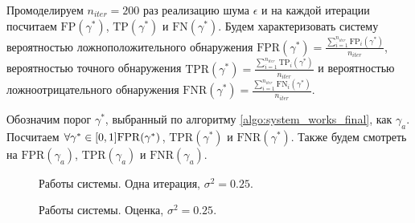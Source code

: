 \documentclass[specialist, substylefile = spbu.rtx,
			   subf, href, 12pt]{disser}
\begin{document}
Промоделируем $ n_{iter}=200 $ раз реализацию шума $ \epsilon $ и на каждой итерации посчитаем $ \mathrm{FP}(\gamma^*) $, $ \mathrm{TP}(\gamma^*) $ и $ \mathrm{FN}(\gamma^*) $. Будем характеризовать систему вероятностью ложноположительного обнаружения $ \mathrm{FPR}(\gamma^*) = \frac{\sum\limits_{i=1}^{n_{iter}}\mathrm{FP}_i(\gamma^*)}{n_{iter}} $, вероятностью точного обнаружения $ \mathrm{TPR}(\gamma^*) = \frac{\sum\limits_{i=1}^{n_{iter}}\mathrm{TP}_i(\gamma^*)}{n_{iter}} $ и вероятностью ложноотрицательного обнаружения $ \mathrm{FNR}(\gamma^*) = \frac{\sum\limits_{i=1}^{n_{iter}}\mathrm{FN}_i(\gamma^*)}{n_{iter}} $.

Обозначим порог $ \gamma^* $, выбранный по алгоритму \ref{algo:system_works_final}, как $ \gamma_a $. Посчитаем $ \forall \gamma^* \in [0, 1] \;\newline \mathrm{FPR}(\gamma^*)$, $ \mathrm{TPR}(\gamma^*) $ и $ \mathrm{FNR}(\gamma^*) $. Также будем смотреть на $ \mathrm{FPR}(\gamma_a)$, $ \mathrm{TPR}(\gamma_a) $ и $ \mathrm{FNR}(\gamma_a) $.

\begin{figure}[!hhh]
	\caption{Работы системы. Одна итерация, $ \sigma^2=0.25 $.}
	\label{pic:system_estimation_one_iter}
\end{figure}

\begin{figure}[!hhh]
	\caption{Работы системы. Оценка, $ \sigma^2=0.25 $.}
	\label{pic:system_estimation}
\end{figure}
\end{document}
